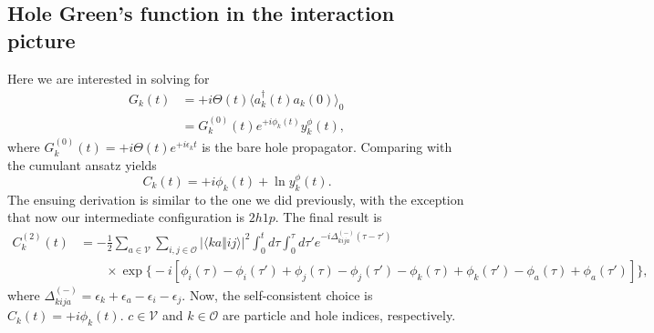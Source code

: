 \subsection{Hole Green's function in the interaction picture}
Here we are interested in solving for 
\begin{align}
    G_k(t)
    &=
    +i\Theta(t)
    \langle
    a_k^\dagger(t)a_k(0)
    \rangle_0 \\
    &= G_k^{(0)}(t)
    e^{+i\phi_k(t)}
    y_k^{\phi}(t),
\end{align}
where $G_k^{(0)}(t)=+i\Theta(t)e^{+i\epsilon_k t}$ is the bare hole propagator. Comparing with the cumulant ansatz yields
\begin{equation}
    {
    C_k(t)
    =
    +i\phi_k(t)
    +
    \ln y_k^{\phi}(t)
    }.
\end{equation}
The ensuing derivation is similar to the one we did previously, with the exception that now our intermediate configuration is $2h1p$. The final result is
\begin{align}
    C^{(2)}_k(t)
    &=
    -
    \frac{1}{2}
    \sum_{a\in\mathcal V}
    \sum_{i,j\in\mathcal O}
    \left|
    \langle ka\Vert ij\rangle
    \right|^2
    \int_0^t d\tau
    \int_0^\tau d\tau'
    e^{-i\Delta_{kija}^{(-)}(\tau-\tau')}
    \nonumber\\
    &\qquad\times
    \exp\Big\{
    -i[
        \phi_i(\tau)-\phi_i(\tau')
        +
        \phi_j(\tau)-\phi_j(\tau')
        -
        \phi_k(\tau)+\phi_k(\tau')
        -
        \phi_a(\tau)+\phi_a(\tau')
    ]
    \Big\},
\end{align}
where $\Delta_{kija}^{(-)}=\epsilon_k+\epsilon_a-\epsilon_i-\epsilon_j$. Now, the self-consistent choice is $C_k(t)=+i\phi_k(t)$. $c\in\mathcal V$ and $k\in\mathcal O$ are particle and hole indices, respectively.
